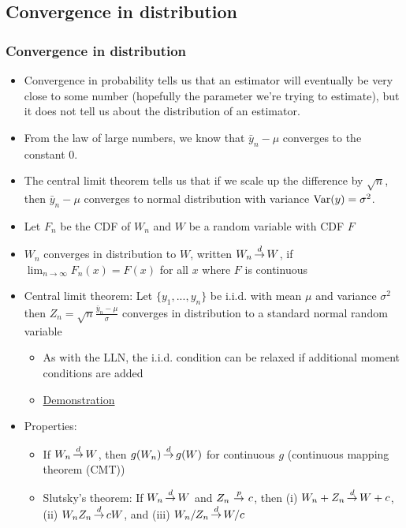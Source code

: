 \subsection{Convergence in distribution}

\begin{frame}[allowframebreaks]\frametitle{Convergence in distribution}
  \begin{itemize}
  \item Convergence in probability tells us that an estimator will eventually
be very close to some number (hopefully the parameter we're trying to
estimate), but it does not tell us about the distribution of an
estimator. 

\item From the law of large numbers, we know that $\bar{y}_n - \mu$
converges to the constant 0. 
\item The central limit theorem tells us that
if we scale up the difference by $\sqrt{n}$, then $\bar{y}_n - \mu$
converges to normal distribution with variance $\mathrm{Var}(y) = \sigma^2$. 
\item Let $F_n$ be the CDF of $W_n$ and $W$ be a random variable
    with CDF $F$
  \item $W_n$ \alert{converges in distribution} to $W$, written $W_n \indist
    W$, if $\lim_{n \to \infty} F_n(x) = F(x)$ for all $x$ where $F$
    is continuous 
  \item \alert{Central limit theorem}: Let $\{y_1, ..., y_n\}$ be i.i.d.
    with mean $\mu$ and variance $\sigma^2$ then $Z_n =
    \sqrt{n} \frac{\bar{y}_n - \mu}{\sigma}$ converges in distribution
    to a standard normal random variable
    \begin{itemize}
    \item As with the LLN, the i.i.d. condition can be relaxed if
      additional moment conditions are added
    \item
      \href{http://en.wikipedia.org/wiki/File:Convergence_in_distribution_(sum_of_uniform_rvs).gif}
      {Demonstration}
    \end{itemize}
  \item Properties:
    \begin{itemize}
    \item If $W_n \indist W$, then $g(W_n) \indist g(W)$ for
      continuous $g$ (\alert{continuous mapping theorem (CMT)})
    \item Slutsky's theorem: If $W_n \indist W$ and $Z_n \inprob c$, then (i) $W_n +
      Z_n \indist W + c$, (ii) $W_n Z_n \indist c W$, and (iii)
      $W_n/Z_n \indist W/c$
    \end{itemize}
 


\end{itemize}
\end{frame}
